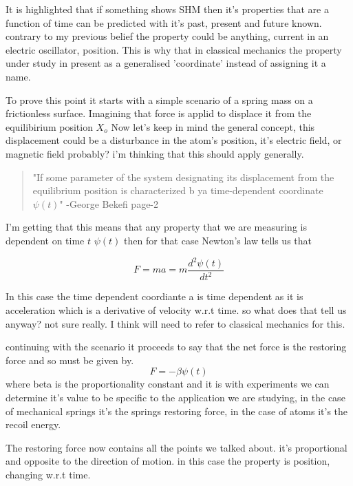 \documentclass[12pt]{article}
\begin{document}
It is highlighted that if something shows SHM then it's properties that are a function of time
can be predicted with it's past, present and future known. contrary to my previous belief the property
could be anything, current in an electric oscillator, position. This is why that in classical mechanics
the property under study in present as a generalised 'coordinate' instead of assigning it a name.

To prove this point it starts with a simple scenario of a spring mass on a frictionless surface.
Imagining that force is applid to displace it from the equilibirium position $ X_o $
Now let's keep in mind the general concept, this displacement could be a disturbance in the atom's position,
it's electric field, or magnetic field probably? i'm thinking that this should apply generally.

\begin{quote}
    "If some parameter of the system designating its displacement from the equilibrium position is characterized b ya time-dependent
    coordinate $\psi(t)$" -George Bekefi page-2
\end{quote}
I'm getting that this means that any property that we are measuring is dependent on time $t$ $\psi(t)$ then for that case Newton's law tells us that
\begin{center}
    \begin{equation}
        F = ma = m \frac{d^2 \psi(t)}{dt^2}
    \end{equation}
\end{center}
In this case the time dependent coordiante a is time dependent as it is acceleration which is a derivative of velocity w.r.t time. so what does that tell us anyway?
not sure really. I think will need to refer to classical mechanics for this.

continuing with the scenario it proceeds to say that the net force is the restoring force and so must be given by.
\begin{equation}
    F = -\beta \psi(t)
\end{equation}
where beta is the proportionality constant and it is with experiments we can determine it's value to be specific to the application we are studying,
in the case of mechanical springs it's the springs restoring force, in the case of atoms it's the recoil energy.

The restoring force now contains all the points we talked about. it's proportional and opposite to the direction of motion. in this case the property is position, changing w.r.t time.
\end{document}
